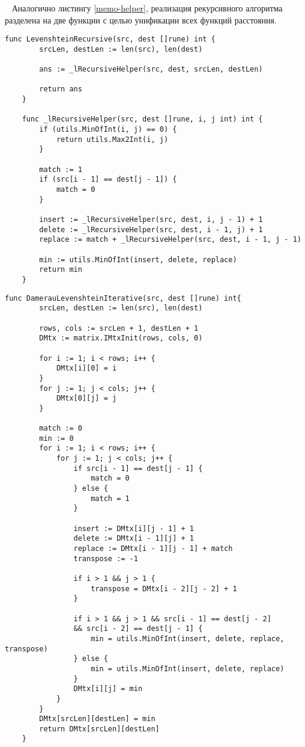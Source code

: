 ~\newline
Аналогично листингу \ref{memo-helper}, реализация рекурсивного алгоритма разделена на две функции с целью унификации всех функций расстояния.
~\newline
\begin{lstlisting}[label=leven-recursive,caption=Программный код нахождения расстояния Левенштейна с рекурсией]
	func LevenshteinRecursive(src, dest []rune) int {
		srcLen, destLen := len(src), len(dest)
		
		ans := _lRecursiveHelper(src, dest, srcLen, destLen)
		
		return ans
	}
	
	func _lRecursiveHelper(src, dest []rune, i, j int) int {
		if (utils.MinOfInt(i, j) == 0) {
			return utils.Max2Int(i, j)
		}
		
		match := 1
		if (src[i - 1] == dest[j - 1]) {
			match = 0
		}
		
		insert := _lRecursiveHelper(src, dest, i, j - 1) + 1
		delete := _lRecursiveHelper(src, dest, i - 1, j) + 1
		replace := match + _lRecursiveHelper(src, dest, i - 1, j - 1)
		
		min := utils.MinOfInt(insert, delete, replace)
		return min
	}
\end{lstlisting}

\begin{lstlisting}[label=damer-lev-iter,caption=Программный код нахождения расстояния Дамерау -- Левенштейна итеративно]
	func DamerauLevenshteinIterative(src, dest []rune) int{
		srcLen, destLen := len(src), len(dest)
		
		rows, cols := srcLen + 1, destLen + 1
		DMtx := matrix.IMtxInit(rows, cols, 0)
		
		for i := 1; i < rows; i++ {
			DMtx[i][0] = i
		}
		for j := 1; j < cols; j++ {
			DMtx[0][j] = j
		}
		
		match := 0
		min := 0
		for i := 1; i < rows; i++ {
			for j := 1; j < cols; j++ {
				if src[i - 1] == dest[j - 1] {
					match = 0
				} else {
					match = 1
				}
				
				insert := DMtx[i][j - 1] + 1
				delete := DMtx[i - 1][j] + 1
				replace := DMtx[i - 1][j - 1] + match
				transpose := -1
				
				if i > 1 && j > 1 {
					transpose = DMtx[i - 2][j - 2] + 1
				}
				
				if i > 1 && j > 1 && src[i - 1] == dest[j - 2] 
				&& src[i - 2] == dest[j - 1] {
					min = utils.MinOfInt(insert, delete, replace, transpose)
				} else {
					min = utils.MinOfInt(insert, delete, replace)
				}
				DMtx[i][j] = min
			}
		}
		DMtx[srcLen][destLen] = min
		return DMtx[srcLen][destLen]
	}	
\end{lstlisting}

